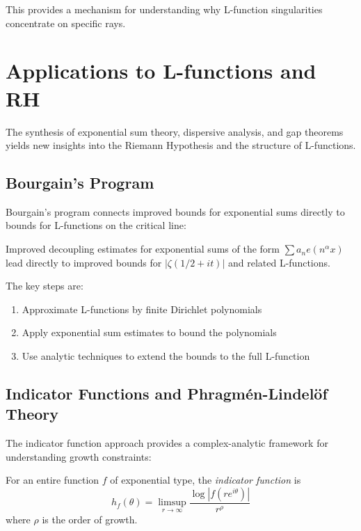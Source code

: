 This provides a mechanism for understanding why L-function singularities concentrate on specific rays.

\section{Applications to L-functions and RH}
\label{sec:applications_rh}

The synthesis of exponential sum theory, dispersive analysis, and gap theorems yields new insights into the Riemann Hypothesis and the structure of L-functions.

\subsection{Bourgain's Program}

Bourgain's program connects improved bounds for exponential sums directly to bounds for L-functions on the critical line:

\begin{theorem}
Improved decoupling estimates for exponential sums of the form $\sum a_n e(n^{\alpha} x)$ lead directly to improved bounds for $|\zeta(1/2 + it)|$ and related L-functions.
\end{theorem}

The key steps are:
\begin{enumerate}
\item Approximate L-functions by finite Dirichlet polynomials
\item Apply exponential sum estimates to bound the polynomials
\item Use analytic techniques to extend the bounds to the full L-function
\end{enumerate}

\subsection{Indicator Functions and Phragmén-Lindelöf Theory}

The indicator function approach provides a complex-analytic framework for understanding growth constraints:

\begin{definition}
For an entire function $f$ of exponential type, the \emph{indicator function} is
\begin{equation}
h_f(\theta) = \limsup_{r \to \infty} \frac{\log|f(re^{i\theta})|}{r^{\rho}}
\end{equation}
where $\rho$ is the order of growth.
\end{definition}

